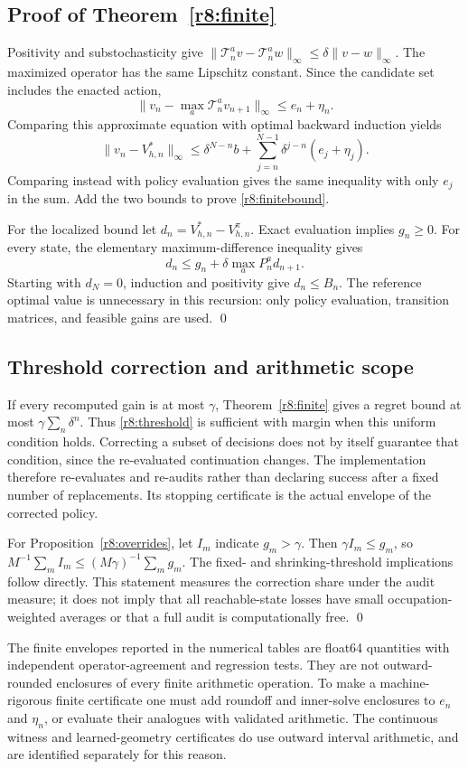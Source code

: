 \subsection{Proof of Theorem~\ref{r8:finite}}
Positivity and substochasticity give
$\|\mathcal T_n^av-\mathcal T_n^aw\|_\infty\leq\delta\|v-w\|_\infty$.
The maximized operator has the same Lipschitz constant. Since the candidate set includes the enacted action,
\[
 \|v_n-\max_a\mathcal T_n^av_{n+1}\|_\infty\leq e_n+\eta_n.
\]
Comparing this approximate equation with optimal backward induction yields
\[
 \|v_n-V_{h,n}^*\|_\infty
 \leq\delta^{N-n}b+\sum_{j=n}^{N-1}\delta^{j-n}(e_j+\eta_j).
\]
Comparing instead with policy evaluation gives the same inequality with only $e_j$ in the sum. Add the two bounds to prove \eqref{r8:finitebound}.

For the localized bound let $d_n=V_{h,n}^*-V_{h,n}^{\pi}$. Exact evaluation implies $g_n\geq0$. For every state, the elementary maximum-difference inequality gives
\[
 d_n\leq g_n+\delta\max_aP_n^ad_{n+1}.
\]
Starting with $d_N=0$, induction and positivity give $d_n\leq B_n$. The reference optimal value is unnecessary in this recursion: only policy evaluation, transition matrices, and feasible gains are used. \qed

\subsection{Threshold correction and arithmetic scope}
If every recomputed gain is at most $\gamma$, Theorem~\ref{r8:finite} gives a regret bound at most $\gamma\sum_n\delta^n$. Thus \eqref{r8:threshold} is sufficient with margin when this uniform condition holds. Correcting a subset of decisions does not by itself guarantee that condition, since the re-evaluated continuation changes. The implementation therefore re-evaluates and re-audits rather than declaring success after a fixed number of replacements. Its stopping certificate is the actual envelope of the corrected policy.

For Proposition~\ref{r8:overrides}, let $I_m$ indicate $g_m>\gamma$. Then $\gamma I_m\leq g_m$, so $M^{-1}\sum_mI_m\leq(M\gamma)^{-1}\sum_mg_m$. The fixed- and shrinking-threshold implications follow directly. This statement measures the correction share under the audit measure; it does not imply that all reachable-state losses have small occupation-weighted averages or that a full audit is computationally free. \qed

The finite envelopes reported in the numerical tables are float64 quantities with independent operator-agreement and regression tests. They are not outward-rounded enclosures of every finite arithmetic operation. To make a machine-rigorous finite certificate one must add roundoff and inner-solve enclosures to $e_n$ and $\eta_n$, or evaluate their analogues with validated arithmetic. The continuous witness and learned-geometry certificates do use outward interval arithmetic, and are identified separately for this reason.

